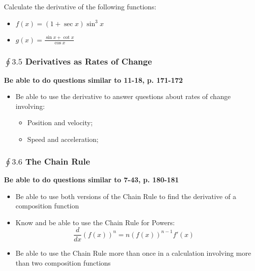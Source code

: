 \documentclass[14pt]{beamer}
\begin{document}
\begin{frame}
\frametitle{}
\begin{exe}
Calculate the derivative of the following functions:
\begin{itemize}
\item $f(x)=(1+\sec x)\sin^3x$

\vspace{1pc}
\item $g(x)=\displaystyle\frac{\sin x+\cot x}{\cos x}$
\end{itemize}
\end{exe}
\end{frame}

\begin{frame}
\frametitle{\small $\oint 3.5$ Derivatives as Rates of Change}
\small
{\bf Be able to do questions similar to 11-18, p. 171-172}

\begin{itemize}
\item Be able to use the derivative to answer questions about rates of change involving: 
	\begin{itemize}
	\item Position and velocity;
	\item Speed and acceleration;
	\end{itemize}
\end{itemize}
\end{frame}

\begin{frame}
\frametitle{\small $\oint 3.6$ The Chain Rule}
\small
{\bf Be able to do questions similar to 7-43, p. 180-181}

\begin{itemize}
\item Be able to use both versions of the Chain Rule to find the derivative of a composition function
\item Know and be able to use the Chain Rule for Powers:
\[\dfrac{d}{dx}\left(f(x)\right)^n=n\left(f(x)\right)^{n-1}f'(x)\]
\item Be able to use the Chain Rule more than once in a calculation involving more than two composition functions 
\end{itemize}
\end{frame}
\end{document}
